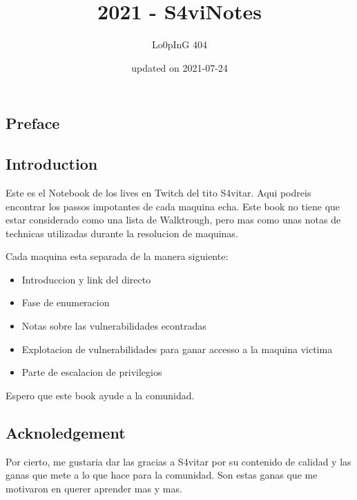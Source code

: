 \documentclass{assets/ipesethesis}
\title{2021 - S4viNotes}
\author{Lo0pInG 404}
\date{updated on 2021-07-24}
\providecommand{\tightlist}{%
  \setlength{\itemsep}{0pt}\setlength{\parskip}{0pt}}
\begin{document}
  \maketitle

\frontmatter %


  \begin{resume}
    \hypertarget{preface}{%
    \section*{Preface}\label{preface}}
    
    \hypertarget{introduction}{%
    \subsection*{Introduction}\label{introduction}}
    
    Este es el Notebook de los lives en Twitch del tito S4vitar. Aqui podreis encontrar los passos impotantes de cada maquina
    echa. Este book no tiene que estar considerado como una lista de Walktrough, pero mas como unas notas de technicas utilizadas
    durante la resolucion de maquinas.
    
    Cada maquina esta separada de la manera siguiente:
    
    \begin{itemize}
    \tightlist
    \item
      Introduccion y link del directo
    \item
      Fase de enumeracion
    \item
      Notas sobre las vulnerabilidades econtradas
    \item
      Explotacion de vulnerabilidades para ganar accesso a la maquina victima
    \item
      Parte de escalacion de privilegios
    \end{itemize}
    
    Espero que este book ayude a la comunidad.
    
    \hypertarget{acknoledgement}{%
    \subsection*{Acknoledgement}\label{acknoledgement}}
    
    Por cierto, me gustaria dar las gracias a S4vitar por su contenido de calidad y las ganas que mete a lo que hace para la comunidad.
    Son estas ganas que me motivaron en querer aprender mas y mas.
  \end{resume}
\end{document}
